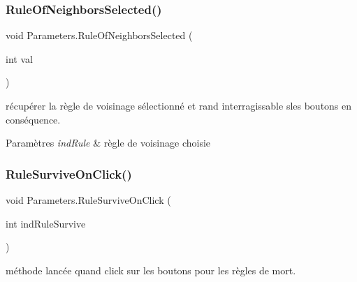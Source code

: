 \subsubsection{\texorpdfstring{Rule\+Of\+Neighbors\+Selected()}{RuleOfNeighborsSelected()}}
{\footnotesize\ttfamily void Parameters.\+Rule\+Of\+Neighbors\+Selected (\begin{DoxyParamCaption}\item[{int}]{val }\end{DoxyParamCaption})\hspace{0.3cm}{\ttfamily [inline]}}



récupérer la règle de voisinage sélectionné et rand interragissable sles boutons en conséquence. 


\begin{DoxyParams}{Paramètres}
{\em ind\+Rule} & règle de voisinage choisie\\
\hline
\end{DoxyParams}
\mbox{\label{class_parameters_af62c0383d55e0653fcd2384b9d49d42f}} 
\subsubsection{\texorpdfstring{Rule\+Survive\+On\+Click()}{RuleSurviveOnClick()}}
{\footnotesize\ttfamily void Parameters.\+Rule\+Survive\+On\+Click (\begin{DoxyParamCaption}\item[{int}]{ind\+Rule\+Survive }\end{DoxyParamCaption})\hspace{0.3cm}{\ttfamily [inline]}}



méthode lancée quand click sur les boutons pour les règles de mort. 



